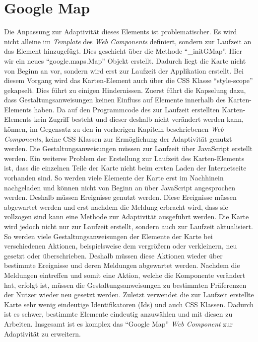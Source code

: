 \documentclass[12pt, paper=a4, bibtotoc, toc=listof, headsepline=true]{scrreprt}
\begin{document}
	\section{Google Map}
	Die Anpassung zur Adaptivität dieses Elements ist problematischer.
	Es wird nicht alleine im \emph{Template} des \emph{Web Components} definiert, sondern zur Laufzeit an das Element hinzugefügt. Dies geschieht über die Methode \enquote{\_initGMap}. Hier wir ein neues \enquote{google.maps.Map} Objekt erstellt. Dadurch liegt die Karte nicht von Beginn an vor, sondern wird erst zur Laufzeit der Applikation erstellt. Bei diesem Vorgang wird das Karten-Element auch über die \ac{CSS} Klasse \enquote{style-scope} gekapselt. Dies führt zu einigen Hindernissen. Zuerst führt die Kapselung dazu, dass Gestaltungsanweisungen keinen Einfluss auf Elemente innerhalb des Karten-Elements haben. Da auf den Programmcode des zur Laufzeit erstellten Karten-Elements kein Zugriff besteht und dieser deshalb  nicht verändert werden kann, können, im Gegensatz zu den in vorherigen Kapiteln beschriebenen \emph{Web Components}, keine \ac{CSS} Klassen zur Ermöglichung der Adaptivität genutzt werden. Die Gestaltungsanweisungen müssen zur Laufzeit über JavaScript erstellt werden. Ein weiteres Problem der Erstellung zur Laufzeit des Karten-Elements ist, dass die einzelnen Teile der Karte nicht beim ersten Laden der Internetseite vorhanden sind. So werden viele Elemente der Karte erst im Nachhinein nachgeladen und können nicht von Beginn an über JavaScript angesprochen werden. Deshalb müssen Ereignisse genutzt werden. Diese Ereignisse müssen abgewartet werden und erst nachdem die Meldung erbracht wird, dass sie vollzogen sind kann eine Methode zur Adaptivität ausgeführt werden. Die Karte wird jedoch nicht nur zur Laufzeit erstellt, sondern auch zur Laufzeit aktualisiert. So werden viele Gestaltungsanweisungen der Elemente der Karte bei verschiedenen Aktionen, beispielsweise dem vergrößern oder verkleinern, neu gesetzt oder überschrieben. Deshalb müssen diese Aktionen wieder über bestimmte Ereignisse und deren Meldungen abgewartet werden. Nachdem die Meldungen eintreffen und somit eine Aktion, welche die Komponente verändert hat, erfolgt ist, müssen die Gestaltungsanweisungen zu bestimmten Präferenzen der Nutzer wieder neu gesetzt werden. Zuletzt verwendet die zur Laufzeit erstellte Karte sehr wenig eindeutige Identifikatoren (Ids) und auch \ac{CSS} Klassen. Dadurch ist es schwer, bestimmte Elemente eindeutig anzuwählen und mit diesen zu Arbeiten. Insgesamt ist es komplex das \enquote{Google Map} \emph{Web Component} zur Adaptivität zu erweitern.
	
\end{document}
